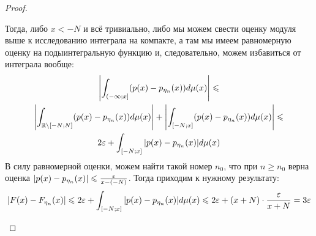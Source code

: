\begin{proof}
\begin{enumerate}
		Тогда, либо $x < -N$ и всё тривиально, либо мы можем свести оценку модуля выше к исследованию интеграла на компакте, а там мы имеем равномерную оценку на подыинтегральную функцию и, следовательно, можем избавиться от интеграла вообще:
		\begin{multline*}
			\left|\int_{\left(-\infty; x\right]} (p(x) - p_{\eta_n}(x))d\mu(x)\right| \leqslant
			\\
			\left|\int_{\mathbb{R} \backslash [-N; N]} (p(x) - p_{\eta_n}(x))d\mu(x)\right| + \left|\int_{[-N; x]} (p(x) - p_{\eta_n}(x))d\mu(x)\right| \leqslant
			\\
			2\varepsilon + \int_{[-N; x]} |p(x) - p_{\eta_n}(x)|d\mu(x)
		\end{multline*}
		В силу равномерной оценки, можем найти такой номер $n_0$, что при $n \ge n_0$ верна оценка $|p(x) - p_{\eta_n}(x)| \leqslant \frac{\varepsilon}{x - (-N)}$. Тогда приходим к нужному результату:
		\[
			\left|F(x) - F_{\eta_n}(x)\right| \leqslant 2\varepsilon + \int_{[-N; x]} |p(x) - p_{\eta_n}(x)|d\mu(x) \leqslant 2\varepsilon + (x + N) \cdot \frac{\varepsilon}{x + N} = 3\varepsilon
		\]
	\end{enumerate}
\end{proof}
